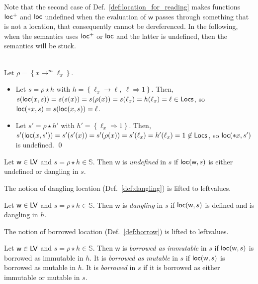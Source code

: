 \noindent
Note that the second case of Def.~\ref{def:location_for_reading}
makes functions $\mathsf{loc^+}$ and $\mathsf{loc}$
undefined when the evaluation of $\mathsf{w}$ passes through something that is not
a location, that consequently cannot be dereferenced.
In the following, when the semantics
uses $\mathsf{loc^+}$ or $\mathsf{loc}$ and the latter is undefined, then the semantics will be stuck.

\begin{example}
  \\
  Let $\rho = \left\{x\to^m\ell_x\right\}$.
  \begin{itemize}
    \item Let $s = \rho\star h$ with
    $h = \left\{\ell_x\to\ell,\ \ell\Rightarrow 1\right\}$.
    Then, $s(\mathsf{loc}(x,s)) = s(s(x)) = s(\rho(x)) = s(\ell_x) =
    h(\ell_x) = \ell\in\mathsf{Locs}$, so
    $\mathsf{loc}(\mathtt{*}x,s)= s(\mathsf{loc}(x,s)) = \ell$.
    \item Let $s' = \rho\star h'$ with
    $h' = \left\{\ell_x\Rightarrow 1\right\}$. Then,
    $s'(\mathsf{loc}(x,s')) = s'(s'(x)) = s'(\rho(x)) = s'(\ell_x) =
    h'(\ell_x) = 1 \not\in\mathsf{Locs}$, so $\mathsf{loc}(\mathtt{*}x,s')$ is undefined.
    \qed
  \end{itemize}
\end{example}

\begin{definition}\label{def:undefined_leftvalues}
  Let $\mathsf{w}\in\mathsf{LV}$ and $s=\rho\star h\in\mathbb{S}$. Then
  $\mathsf{w}$ is \emph{undefined} in $s$ if $\mathsf{loc}(\mathsf{w},s)$ is either undefined
  or dangling in $s$.
\end{definition}

The notion of dangling location (Def.~\ref{def:dangling}) is lifted to leftvalues.

\begin{definition}\label{def:dangling_leftvalues}
  Let $\mathsf{w}\in\mathsf{LV}$ and $s=\rho\star h\in\mathbb{S}$. Then
  $\mathsf{w}$ is \emph{dangling} in $s$ if $\mathsf{loc}(\mathsf{w},s)$ is defined and is dangling in $h$.
\end{definition}

The notion of borrowed location (Def.~\ref{def:borrow}) is lifted to leftvalues.

\begin{definition}\label{def:borrowed_leftvalues}
  Let $\mathsf{w}\in\mathsf{LV}$ and $s=\rho\star h\in\mathbb{S}$. Then
  $\mathsf{w}$ is \emph{borrowed as immutable} in $s$
  if $\mathsf{loc}(\mathsf{w},s)$ is borrowed as
  immutable in $h$. It is \emph{borrowed as mutable} in $s$ if
  $\mathsf{loc}(\mathsf{w},s)$ is borrowed as
  mutable in $h$. It is \emph{borrowed} in $s$
  if it is borrowed as either immutable or mutable in $s$.
\end{definition}

